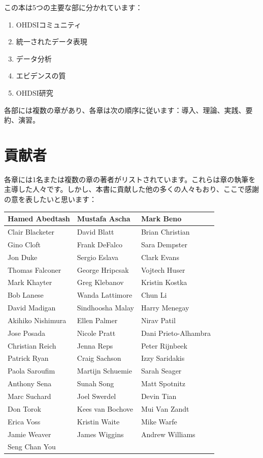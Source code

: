 \documentclass[
  11pt]{book}
\providecommand{\tightlist}{%
  \setlength{\itemsep}{0pt}\setlength{\parskip}{0pt}}
\theoremstyle{definition}
\theoremstyle{definition}
\theoremstyle{definition}
\theoremstyle{definition}
\theoremstyle{remark}
\begin{document}
この本は5つの主要な部に分かれています：

\begin{enumerate}
\def\labelenumi{\Roman{enumi}.}
\tightlist
\item
  OHDSIコミュニティ
\item
  統一されたデータ表現
\item
  データ分析
\item
  エビデンスの質
\item
  OHDSI研究
\end{enumerate}

各部には複数の章があり、各章は次の順序に従います：導入、理論、実践、要約、演習。

\section*{貢献者}\label{ux8ca2ux732eux8005}

各章には1名または複数の章の著者がリストされています。これらは章の執筆を主導した人々です。しかし、本書に貢献した他の多くの人々もおり、ここで感謝の意を表したいと思います：

\begin{tabular}{l|l|l}
\hline
Hamed Abedtash & Mustafa Ascha & Mark Beno\\
\hline
Clair Blacketer & David Blatt & Brian Christian\\
\hline
Gino Cloft & Frank DeFalco & Sara Dempster\\
\hline
Jon Duke & Sergio Eslava & Clark Evans\\
\hline
Thomas Falconer & George Hripcsak & Vojtech Huser\\
\hline
Mark Khayter & Greg Klebanov & Kristin Kostka\\
\hline
Bob Lanese & Wanda Lattimore & Chun Li\\
\hline
David Madigan & Sindhoosha Malay & Harry Menegay\\
\hline
Akihiko Nishimura & Ellen Palmer & Nirav Patil\\
\hline
Jose Posada & Nicole Pratt & Dani Prieto-Alhambra\\
\hline
Christian Reich & Jenna Reps & Peter Rijnbeek\\
\hline
Patrick Ryan & Craig Sachson & Izzy Saridakis\\
\hline
Paola Saroufim & Martijn Schuemie & Sarah Seager\\
\hline
Anthony Sena & Sunah Song & Matt Spotnitz\\
\hline
Marc Suchard & Joel Swerdel & Devin Tian\\
\hline
Don Torok & Kees van Bochove & Mui Van Zandt\\
\hline
Erica Voss & Kristin Waite & Mike Warfe\\
\hline
Jamie Weaver & James Wiggins & Andrew Williams\\
\hline
Seng Chan You &  & \\
\hline
\end{tabular}
\end{document}
